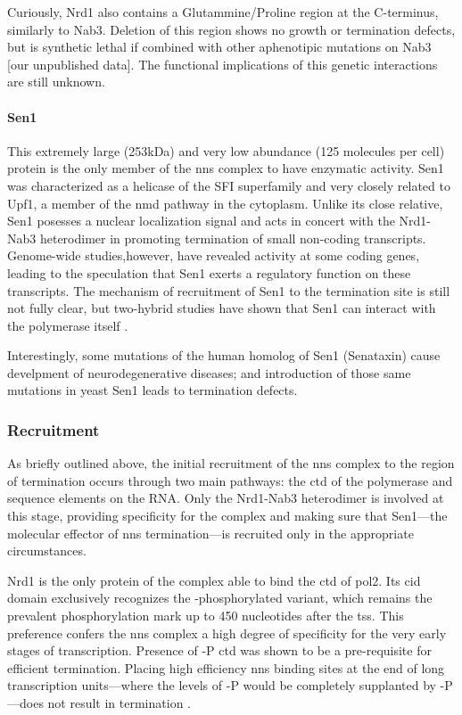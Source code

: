 Curiously, Nrd1 also contains a Glutammine/Proline region at the C-terminus, similarly to Nab3. 
Deletion of this region shows no growth or termination defects, but is synthetic lethal if combined with other aphenotipic mutations on Nab3 [our unpublished data].
The functional implications of this genetic interactions are still unknown. 

\paragraph{Sen1}

This extremely large (253kDa) and very low abundance (125 molecules per cell) protein is the only member of the \gls{nns} complex to have enzymatic activity.
Sen1 was characterized as a helicase of the SFI superfamily and very closely related to Upf1, a member of the \gls{nmd} pathway in the cytoplasm.
Unlike its close relative, Sen1 posesses a nuclear localization signal and acts in concert with the Nrd1-Nab3 heterodimer in promoting termination of small non-coding transcripts.
Genome-wide studies,however, have revealed activity at some coding genes, leading to the speculation that Sen1 exerts a regulatory function on these transcripts. 
The mechanism of recruitment of Sen1 to the termination site is still not fully clear, but two-hybrid studies have shown that Sen1 can interact with the polymerase itself . 

Interestingly, some mutations of the human homolog of Sen1 (Senataxin) cause develpment of neurodegenerative diseases; and introduction of those same mutations in yeast Sen1 leads to termination defects.

\subsubsection{Recruitment}

As briefly outlined above, the initial recruitment of the \gls{nns} complex to the region of termination occurs through two main pathways: the \gls{ctd} of the polymerase and sequence elements on the RNA.
Only the Nrd1-Nab3 heterodimer is involved at this stage, providing specificity for the complex and making sure that Sen1---the molecular effector of \gls{nns} termination---is recruited only in the appropriate circumstances.

Nrd1 is the only protein of the complex able to bind the \gls{ctd} of \gls{pol2}.
Its \gls{cid} domain exclusively recognizes the \serf{}-phosphorylated variant, which remains the prevalent phosphorylation mark up to 450 nucleotides after the \gls{tss}.
This preference confers the \gls{nns} complex a high degree of specificity for the very early stages of transcription.
Presence of \serf{}-P \gls{ctd} was shown to be a pre-requisite for efficient termination.
Placing high efficiency \gls{nns} binding sites at the end of long transcription units---where the levels of \serf{}-P would be completely supplanted by \sert{}-P---does not result in termination \cite{gudipati:2008:phosphorylation}.

